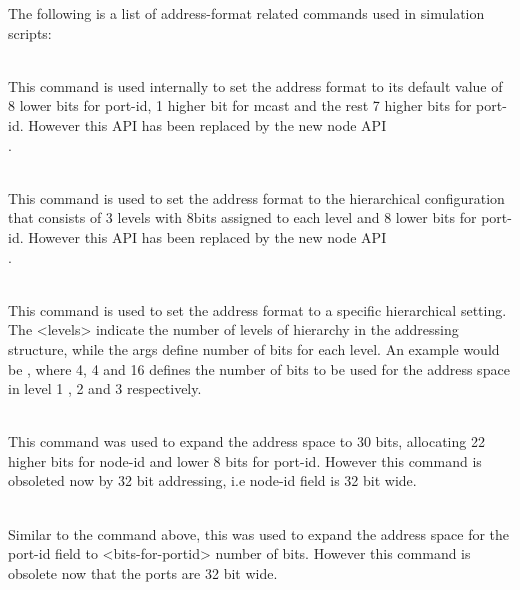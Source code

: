 The following is a list of address-format related commands used in simulation
scripts:
\begin{flushleft}
\\
This command is used internally to set the address format to its default value
of 8 lower bits for port-id, 1 higher bit for mcast and the rest 7 higher bits
for port-id. However this API has been replaced by the new node API\\
.


\\
This command is used to set the address format to the hierarchical configuration
that consists of 3 levels with 8bits assigned to each level and 8 lower bits
for port-id. However this API has been replaced by the new node API\\
.


\\
This command is used to set the address format to a specific hierarchical
setting. The <levels> indicate the number of levels of hierarchy in the addressing
structure, while the args define number of bits for each level. An example
would be  , where 4, 4 and
16 defines the number of bits to be used for the address space in level 1 , 2
and 3 respectively.


\\
This command was used to expand the address space to 30 bits, allocating
22 higher bits for node-id and lower 8 bits for port-id. However this command
is obsoleted now by 32 bit addressing, i.e node-id field is 32 bit wide.


\\
Similar to the command above, this was used to expand the address space for
the port-id field to <bits-for-portid> number of bits. However this command
is obsolete now that the ports are 32 bit wide.


\end{flushleft}
\endinput






